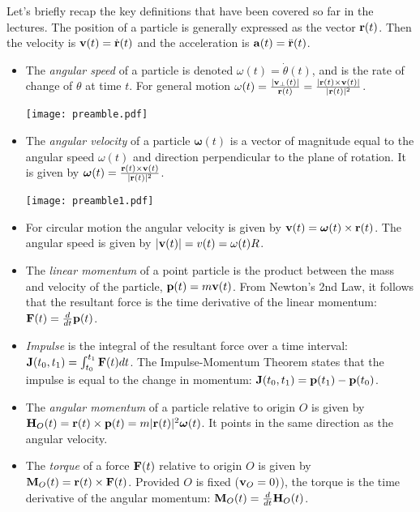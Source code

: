Let's briefly recap the key definitions that have been covered so far in the lectures. The position of a particle is generally expressed as the vector ${\bf r}(t)$. Then the velocity is ${\bf v}(t)=\dot{\bf r}(t)$ and the acceleration is ${\bf a}(t)=\ddot{\bf r}(t)$.

\begin{itemize}
  \item The {\em angular speed} of a particle is denoted $\omega(t)=\dot{\theta}(t)$, and is the rate of change of $\theta$ at time $t$.  For general motion $\omega(t)=\frac{|{\bf v}_{\perp}(t)|}{{\bf r}(t)}=\frac{|{\bf r}(t)\times{\bf v}(t)|}{|{\bf r}(t)|^{2}}$.
		   \begin{center}
                   \texttt{[image: preamble.pdf]}
                   \end{center}

  \item The {\em angular velocity} of a particle $\boldsymbol{\omega}(t)$ is a vector of magnitude equal to the angular speed $\omega(t)$ and direction perpendicular to the plane of rotation.  It is given by $\boldsymbol{\omega}(t)=\frac{{\bf r}(t)\times{\bf v}(t)}{|{\bf r}(t)|^{2}}$.
          \begin{center}
        \texttt{[image: preamble1.pdf]}
        \end{center}
 
 \item For circular motion the angular velocity is given by ${\bf v}(t)=\boldsymbol{\omega}(t)\times {\bf r}(t)$. The angular speed is given by $|{\bf v}(t)|=v(t)=\omega(t) R$.
 
  \item The {\em linear momentum} of a point particle is the product between the mass and velocity of the particle, ${\bf p}(t)=m{\bf v}(t)$. From Newton's 2nd Law, it follows that the resultant force is the time derivative of the linear momentum: ${\bf F}(t)=\frac{d}{dt}{\bf p}(t)$.
  \item {\em Impulse} is the integral of the resultant force over a time interval: ${\bf J}(t_{0},t_{1})=\int_{t_{0}}^{t_{1}} {\bf F}(t) dt$. The Impulse-Momentum Theorem states that the impulse is equal to the change in momentum: \newline ${\bf J}(t_{0},t_{1})={\bf p}(t_{1})-{\bf p}(t_{0})$.
  \item The {\em angular momentum} of a particle relative to origin $O$ is given by ${\bf H}_{O}(t)={\bf r}(t)\times {\bf p}(t)=m |{\bf r}(t)|^{2}\boldsymbol{\omega}(t)$. It points in the same direction as the angular velocity.
  \item The {\em torque} of a force ${\bf F}(t)$ relative to origin $O$ is given by ${\bf M}_{O}(t)={\bf r}(t)\times {\bf F}(t)$. Provided $O$ is fixed (${\bf v}_{O}=0)$), the torque is the time derivative of the angular momentum: ${\bf M}_{O}(t)=\frac{d}{dt}{\bf H}_{O}(t)$.
  

\end{itemize}
